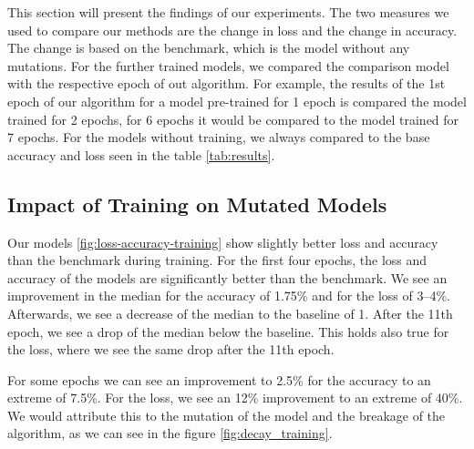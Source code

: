 This section will present the findings of our experiments.
The two measures we used to compare our methods are the change in loss and the change in accuracy.
The change is based on the benchmark, which is the model without any mutations.
For the further trained models, we compared the comparison model with the respective epoch of out algorithm.
For example, the results of the 1st epoch of our algorithm for a model pre-trained for 1 epoch is compared the model trained for 2 epochs, for 6 epochs it would be compared to the model trained for 7 epochs.
For the models without training, we always compared to the base accuracy and loss seen in the table \ref{tab:results}.


\subsection{Impact of Training on Mutated Models}\label{subsec:impact-of-training-on-mutated-models}
Our models \ref{fig:loss-accuracy-training} show slightly better loss and accuracy than the benchmark during training.
For the first four epochs, the loss and accuracy of the models are significantly better than the benchmark.
We see an improvement in the median for the accuracy of 1.75\% and for the loss of 3--4\%.
Afterwards, we see a decrease of the median to the baseline of 1.
After the 11th epoch, we see a drop of the median below the baseline.
This holds also true for the loss, where we see the same drop after the 11th epoch.

For some epochs we can see an improvement to 2.5\% for the accuracy to an extreme of 7.5\%.
For the loss, we see an 12\% improvement to an extreme of 40\%.
We would attribute this to the mutation of the model and the breakage of the algorithm, as we can see in the figure \ref{fig:decay_training}.

